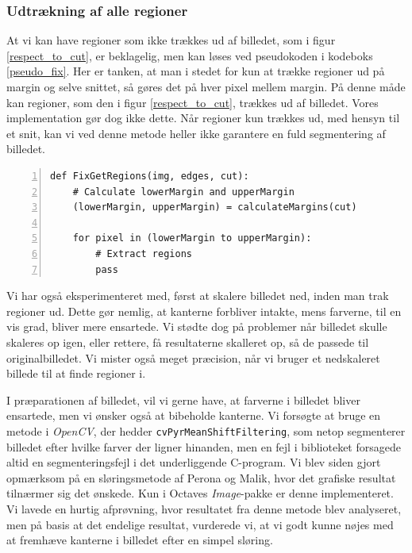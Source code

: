 {\subsubsection{Udtrækning af alle regioner}
At vi kan have regioner som ikke trækkes ud af billedet, som i figur
\ref{respect_to_cut}, er beklagelig, men kan løses ved pseudokoden i
kodeboks \ref{pseudo_fix}.  Her er tanken, at man i stedet for kun at
trække regioner ud på margin og selve snittet, så gøres det på hver
pixel mellem margin. På denne måde kan regioner, som den i figur
\ref{respect_to_cut}, trækkes ud af billedet. Vores implementation gør
dog ikke dette. Når regioner kun trækkes ud, med hensyn til et snit, kan
vi ved denne metode heller ikke garantere en fuld segmentering af
billedet.

\begin{lstlisting}[caption={Pseudokode til udtrækning af regioner med
    margin.},captionpos=b,label={pseudo_fix},numbers=left,
    frame=tb, breaklines=false, float=h]
def FixGetRegions(img, edges, cut):
    # Calculate lowerMargin and upperMargin
    (lowerMargin, upperMargin) = calculateMargins(cut)

    for pixel in (lowerMargin to upperMargin):
        # Extract regions
        pass
\end{lstlisting}

Vi har også eksperimenteret med, først at skalere billedet ned, inden
man trak regioner ud. Dette gør nemlig, at kanterne forbliver intakte,
mens farverne, til en vis grad, bliver mere ensartede. Vi stødte dog på
problemer når billedet skulle skaleres op igen, eller rettere, få
resultaterne skalleret op, så de passede til originalbilledet. Vi mister
også meget præcision, når vi bruger et nedskaleret billede til at finde
regioner i.


I præparationen af billedet, vil vi gerne have, at farverne i billedet
bliver ensartede, men vi ønsker også at bibeholde kanterne. Vi forsøgte
at bruge en metode i \emph{OpenCV}, der hedder
\texttt{cvPyrMeanShiftFiltering}, som netop segmenterer billedet efter
hvilke farver der ligner hinanden, men en fejl i biblioteket forsagede
altid en segmenteringsfejl i det underliggende C-program. Vi blev siden
gjort opmærksom på en sløringsmetode af Perona og
Malik\cite{perona1990scale}, hvor det grafiske resultat tilnærmer sig
det ønskede. Kun i Octaves \emph{Image}-pakke er denne implementeret. Vi
lavede en hurtig afprøvning, hvor resultatet fra denne metode blev
analyseret, men på basis at det endelige resultat, vurderede vi, at vi
godt kunne nøjes med at fremhæve kanterne i billedet efter en simpel
sløring.

}
